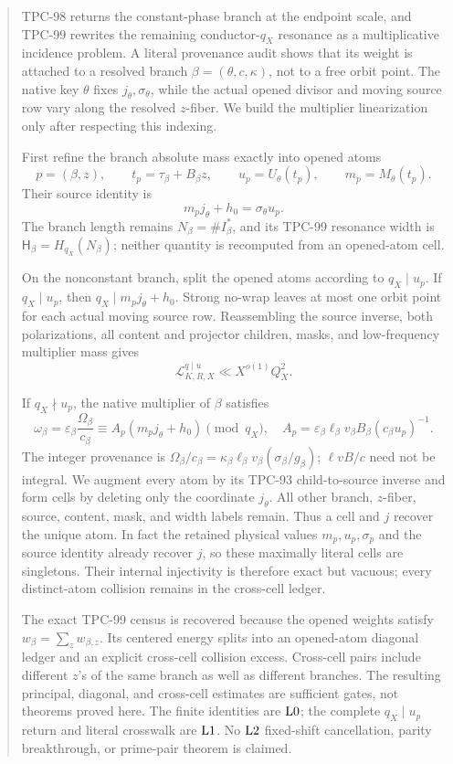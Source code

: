 \begin{abstract}
TPC-98 returns the constant-phase branch at the endpoint scale, and
TPC-99 rewrites the remaining conductor-\(q_X\) resonance as a
multiplicative incidence problem.  A literal provenance audit shows
that its weight is attached to a resolved branch
\(\beta=(\theta,c,\kappa)\), not to a free orbit point.  The native
key \(\theta\) fixes \(j_\theta,\sigma_\theta\), while the actual
opened divisor and moving source row vary along the resolved
\(z\)-fiber.  We build the multiplier linearization only after
respecting this indexing.

First refine the branch absolute mass exactly into opened atoms
\[
 p=(\beta,z),\qquad
 t_p=\tau_\beta+B_\beta z,\qquad
 u_p=U_\theta(t_p),\qquad
 m_p=M_\theta(t_p).
\]
Their source identity is
\[
 m_pj_\theta+h_0=\sigma_\theta u_p.
\]
The branch length remains
\(N_\beta=\#I_\beta^\ast\), and its TPC-99 resonance width is
\(\mathsf H_\beta=H_{q_X}(N_\beta)\); neither quantity is recomputed from an
opened-atom cell.

On the nonconstant branch, split the opened atoms according to
\(q_X\mid u_p\).  If \(q_X\mid u_p\), then
\(q_X\mid m_pj_\theta+h_0\).  Strong no-wrap leaves at most one
orbit point for each actual moving source row.  Reassembling the
source inverse, both polarizations, all content and projector
children, masks, and low-frequency multiplier mass gives
\[
 \boxed{\mathcal L^{q\mid u}_{K,R,X}
 \ll X^{o(1)}Q_X^2.}
\]

If \(q_X\nmid u_p\), the native multiplier of \(\beta\) satisfies
\[
 \omega_\beta
 =
 \varepsilon_\beta\frac{\Omega_\beta}{c_\beta}
 \equiv
 A_p(m_pj_\theta+h_0)\pmod{q_X},
\quad
 A_p=\varepsilon_\beta\ell_\beta v_\beta B_\beta
 (c_\beta u_p)^{-1}.
\]
The integer provenance is
\(\Omega_\beta/c_\beta
=\kappa_\beta\ell_\beta v_\beta(\sigma_\beta/g_\beta)\);
\(\ell vB/c\) need not be integral.  We augment every atom by its
TPC-93 child-to-source inverse and form cells by deleting only the
coordinate \(j_\theta\).  All other branch, \(z\)-fiber, source,
content, mask, and width labels remain.  Thus a cell and \(j\)
recover the unique atom.  In fact the retained physical values
\(m_p,u_p,\sigma_p\) and the source identity already recover \(j\),
so these maximally literal cells are singletons.  Their internal
injectivity is therefore exact but vacuous; every distinct-atom
collision remains in the cross-cell ledger.

The exact TPC-99 census is recovered because the opened weights
satisfy \(w_\beta=\sum_z w_{\beta,z}\).  Its centered energy splits
into an opened-atom diagonal ledger and an explicit cross-cell
collision excess.  Cross-cell pairs include different \(z\)'s of
the same branch as well as different branches.  The resulting
principal, diagonal, and cross-cell estimates are sufficient gates,
not theorems proved here.  The finite identities are \(\Lzero\);
the complete \(q_X\mid u_p\) return and literal crosswalk are
\(\Lone\).  No \(\Ltwo\) fixed-shift cancellation, parity
breakthrough, or prime-pair theorem is claimed.
\end{abstract}
